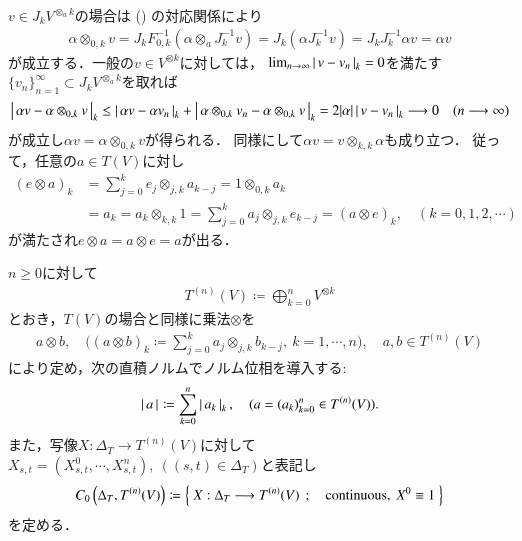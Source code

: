 	\begin{prf}
		$v \in J_k V^{\otimes_a k}$の場合は
		()
		の対応関係により
		\begin{align}
			\alpha \otimes_{0,k} v
			= J_k F_{0,k}^{-1}\left( \alpha \otimes_a J_k^{-1}v \right)
			= J_k \left( \alpha J_k^{-1}v \right)
			= J_k J_k^{-1} \alpha v
			= \alpha v
		\end{align}
		が成立する．一般の$v \in V^{\otimes k}$に対しては，
		$\lim_{n \to \infty} \left|\, v-v_n\, \right|_{k} = 0$を満たす
		$\{v_n\}_{n=1}^\infty \subset J_k V^{\otimes_a k}$を取れば
		\begin{align}
			\left|\, \alpha v - \alpha \otimes_{0,k} v\, \right|_{k}
			\leq \left|\, \alpha v - \alpha v_n\, \right|_{k}
				+ \left|\, \alpha \otimes_{0,k} v_n - \alpha \otimes_{0,k} v\, \right|_{k}
			= 2|\alpha| \left|\, v-v_n\, \right|_{k}
			\longrightarrow 0
			\quad (n \longrightarrow \infty)
		\end{align}
		が成立し$\alpha v = \alpha \otimes_{0,k} v$が得られる．
		同様にして$\alpha v = v \otimes_{k,k} \alpha$も成り立つ．
		従って，任意の$a \in T(V)$に対し
		\begin{align}
			(e \otimes a)_k
			&= \sum_{j=0}^k e_j \otimes_{j,k} a_{k-j}
			= 1 \otimes_{0,k} a_k \\
			&= a_k
			= a_k \otimes_{k,k} 1
			= \sum_{j=0}^k a_j \otimes_{j,k} e_{k-j}
			= (a \otimes e)_k,
			\quad (k=0,1,2,\cdots)
		\end{align}
		が満たされ$e \otimes a = a \otimes e = a$が出る．
		\QED
	\end{prf}
	
	$n \geq 0$に対して
	\begin{align}
		T^{(n)}(V) \coloneqq \bigoplus_{k=0}^{n} V^{\otimes k}
	\end{align}
	とおき，$T(V)$の場合と同様に乗法$\otimes$を
	\begin{align}
		a \otimes b,\quad
		\Biggl((a \otimes b)_k \coloneqq \sum_{j=0}^{k} a_j \otimes_{j,k} b_{k-j},\ k=1,\cdots,n \Biggr),
		\quad a,b \in T^{(n)}(V)
	\end{align}
	により定め，次の直積ノルムでノルム位相を導入する:
	\begin{align}
		\left|\, a\, \right|_{} \coloneqq \sum_{k=0}^n \left|\, a_k\, \right|_{k},
		\quad (a = (a_k)_{k=0}^n \in T^{(n)}(V)).
		\label{eq:def_norm_on_truncated_tensor_algebra}
	\end{align}
	また，写像$X:\Delta_T \longrightarrow T^{(n)}(V)$に対して
	$X_{s,t} = (X^0_{s,t},\cdots,X^n_{s,t}),\ ((s,t) \in \Delta_T)$と表記し
	\begin{align}
		C_0 \left(\Delta_T,T^{(n)}(V) \right)
		\coloneqq \left\{\ X:\Delta_T \longrightarrow T^{(n)}(V)\ \, ; \quad \mbox{continuous},\ X^0 \equiv 1\ \right\}
	\end{align}
	を定める．
	
